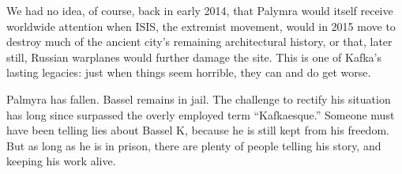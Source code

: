 We had no idea, of course, back in early 2014, that Palymra would itself
receive worldwide attention when ISIS, the extremist movement, would in
2015 move to destroy much of the ancient city's remaining architectural
history, or that, later still, Russian warplanes would further damage
the site. This is one of Kafka's lasting legacies: just when things seem
horrible, they can and do get worse.

Palmyra has fallen. Bassel remains in jail. The challenge to rectify his
situation has long since surpassed the overly employed term
``Kafkaesque.'' Someone must have been telling lies about Bassel K,
because he is still kept from his freedom. But as long as he is in
prison, there are plenty of people telling his story, and keeping his
work alive.
